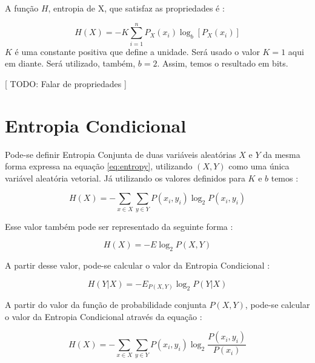 A função $H$, entropia de X, que satisfaz as propriedades é \cite{shannon}:

\begin{equation}
    H(X) = - K \sum_{i=1}^{n} P_X(x_i) \log_b{[P_X(x_i)]}
\label{eq:entropy}
\end{equation}
$K$ é uma constante positiva que define a unidade. Será usado o valor $K=1$ aqui em diante. Será utilizado, também, $b=2$. Assim, temos o resultado em bits.

[ TODO: Falar de propriedades ]

\section{Entropia Condicional}

Pode-se definir Entropia Conjunta de duas variáveis aleatórias $X$ e $Y$ da mesma forma expressa na equação \ref{eq:entropy}, utilizando $(X, Y)$ como uma única variável aleatória vetorial. Já utilizando os valores definidos para $K$ e $b$ temos \cite{livro}:

\begin{equation}
    H(X) = - \sum_{x \in X}\sum_{y \in Y} P(x_i, y_i) \log_2{P(x_i, y_i)}
\label{eq:joint_entropy}
\end{equation}

Esse valor também pode ser representado da seguinte forma \cite{livro}:

\begin{equation}
    H(X) = - E \log_2{P(X, Y)}
\end{equation}

A partir desse valor, pode-se calcular o valor da Entropia Condicional \cite{livro}:

\begin{equation}
    H(Y|X) = - E_{P(X,Y)} \log_2{P(Y|X)}
\end{equation}

A partir do valor da função de probabilidade conjunta $P(X,Y)$, pode-se calcular o valor da Entropia Condicional através da equação \cite{livro}:

\begin{equation}
    H(X) = - \sum_{x \in X}\sum_{y \in Y} P(x_i, y_i) \log_2{\frac{P(x_i, y_i)}{P(x_i)}}
\end{equation}





